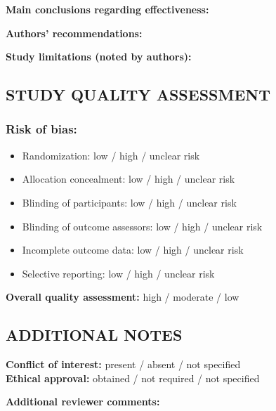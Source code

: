 \documentclass[
hf,
]{ceurart}
\begin{document}
\noindent\textbf{Main conclusions regarding effectiveness:} \underline{\hspace{6cm}}\\
\underline{\hspace{\textwidth}}

\noindent\textbf{Authors' recommendations:} \underline{\hspace{7cm}}\\
\underline{\hspace{\textwidth}}

\noindent\textbf{Study limitations (noted by authors):} \underline{\hspace{5cm}}\\
\underline{\hspace{\textwidth}}

\subsection*{STUDY QUALITY ASSESSMENT}

\subsubsection*{Risk of bias:}
\begin{itemize}
    \item Randomization: low / high / unclear risk
    \item Allocation concealment: low / high / unclear risk
    \item Blinding of participants: low / high / unclear risk
    \item Blinding of outcome assessors: low / high / unclear risk
    \item Incomplete outcome data: low / high / unclear risk
    \item Selective reporting: low / high / unclear risk
\end{itemize}

\noindent\textbf{Overall quality assessment:} high / moderate / low

\subsection*{ADDITIONAL NOTES}

\noindent\textbf{Conflict of interest:} present / absent / not specified\\
\textbf{Ethical approval:} obtained / not required / not specified

\noindent\textbf{Additional reviewer comments:} \underline{\hspace{6cm}}\\
\underline{\hspace{\textwidth}}\\
\underline{\hspace{\textwidth}}
\end{document}
